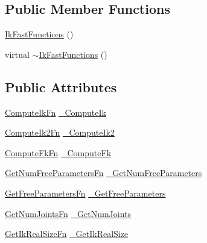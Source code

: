 \subsection*{Public Member Functions}
\begin{DoxyCompactItemize}
\item 
\hyperlink{classikfast_1_1IkFastFunctions_ae5fdd9b86135849b887ae95f8abdfcee}{Ik\-Fast\-Functions} ()
\item 
virtual \hyperlink{classikfast_1_1IkFastFunctions_a811179abadd14264edd35248914e65bd}{$\sim$\-Ik\-Fast\-Functions} ()
\end{DoxyCompactItemize}
\subsection*{Public Attributes}
\begin{DoxyCompactItemize}
\item 
\hyperlink{classikfast_1_1IkFastFunctions_a4bf1d6c1c81b69e2990d9e4bac57ca6f}{Compute\-Ik\-Fn} \hyperlink{classikfast_1_1IkFastFunctions_a75775a9a8c284f52cb6cc473c434163c}{\-\_\-\-Compute\-Ik}
\item 
\hyperlink{classikfast_1_1IkFastFunctions_ac7350210edd45a662ff961ffc4bcca0f}{Compute\-Ik2\-Fn} \hyperlink{classikfast_1_1IkFastFunctions_a80a08b6a3fb3cd0e60e25fc6384d733c}{\-\_\-\-Compute\-Ik2}
\item 
\hyperlink{classikfast_1_1IkFastFunctions_ad69044909936c82f15dc7412bba148bd}{Compute\-Fk\-Fn} \hyperlink{classikfast_1_1IkFastFunctions_a5a30a89afe6314eb86a05c3bd5a1a303}{\-\_\-\-Compute\-Fk}
\item 
\hyperlink{classikfast_1_1IkFastFunctions_a0dff63763caf3748a37703a8d2a0b257}{Get\-Num\-Free\-Parameters\-Fn} \hyperlink{classikfast_1_1IkFastFunctions_ac78c6f4a428df5b34944510af3abd68f}{\-\_\-\-Get\-Num\-Free\-Parameters}
\item 
\hyperlink{classikfast_1_1IkFastFunctions_aa86be2aa954cb58428a9266e49637f92}{Get\-Free\-Parameters\-Fn} \hyperlink{classikfast_1_1IkFastFunctions_a2c57255d31921839afb1ed5c5f86c7cc}{\-\_\-\-Get\-Free\-Parameters}
\item 
\hyperlink{classikfast_1_1IkFastFunctions_ac56ef17997969248944c8ed23cbd713f}{Get\-Num\-Joints\-Fn} \hyperlink{classikfast_1_1IkFastFunctions_aa7aadc4d797b2ecc3811a7887b0b0dfc}{\-\_\-\-Get\-Num\-Joints}
\item 
\hyperlink{classikfast_1_1IkFastFunctions_a8fdfa2de1f393a175d2c7629d1388b24}{Get\-Ik\-Real\-Size\-Fn} \hyperlink{classikfast_1_1IkFastFunctions_a6e0b57e5123af02f5d27c894eac23181}{\-\_\-\-Get\-Ik\-Real\-Size}

\end{DoxyCompactItemize}
